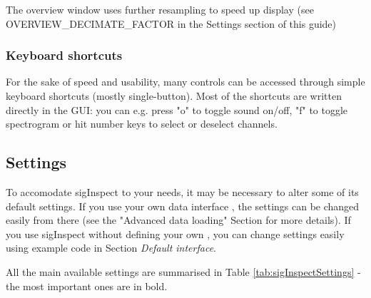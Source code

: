 \documentclass[a4paper,10pt]{article}
\begin{document}
The overview window uses further resampling to speed up display (see OVERVIEW\_DECIMATE\_FACTOR in the Settings section of this guide)

\subsubsection{Keyboard shortcuts}
For the sake of speed and usability, many controls can be accessed through simple keyboard shortcuts (mostly single-button). Most of the shortcuts are written directly in the GUI: you can e.g. press "o" to toggle sound on/off, "f" to toggle spectrogram or hit number keys to select or deselect channels.

\subsection{Settings}
To accomodate sigInspect to your needs, it may be necessary to alter some of its default settings. If you use your own data interface , the settings can be changed easily from there (see the "Advanced data loading" Section for more details). If you use sigInspect without defining your own , you can change settings easily using example code in Section \emph{Default interface}. 

All the main available settings are summarised in Table \ref{tab:sigInspectSettings} - the most important ones are in bold.

\end{document}
